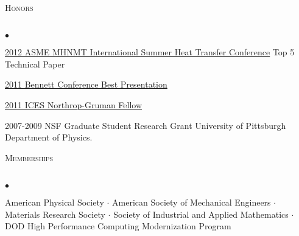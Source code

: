 \documentclass{article}
\newcommand{\lineunder}{\vspace*{-8pt} \\ \hspace*{-18pt} \hrulefill \\}
\newcommand{\header}[1]{{\hspace*{-15pt}\vspace*{6pt} \textsc{#1}} \vspace*{-6pt} \lineunder}
\newenvironment{achievements}{\begin{list}{$\bullet$}{\topsep 0pt \itemsep -2pt}}{\vspace*{4pt}\end{list}}
\begin{document}
\header{Honors}
\begin{achievements}
\item \href{http://www.asmeconferences.org/HT2012/}{2012 ASME MHNMT International Summer Heat Transfer Conference} Top 5 Technical Paper
\item \href{http://www.cmu.edu/me/news/archive/2011/bennett-conference.html}{2011 Bennett Conference Best Presentation}
\item \href{http://www.ices.cmu.edu/newsitem.asp?NewsID=749}{2011 ICES Northrop-Gruman Fellow}
\item 2007-2009 NSF Graduate Student Research Grant University of Pittsburgh Department of Physics.
\end{achievements}

\header{Memberships}
\begin{achievements}
\item American Physical Society $\cdot$ American Society of Mechanical Engineers 
$\cdot$ Materials Research Society $\cdot$ Society of Industrial and Applied Mathematics $\cdot$ DOD High Performance Computing Modernization Program
\end{achievements}
\end{document}
